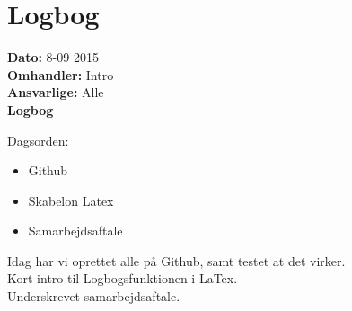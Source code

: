 \chapter{Logbog}

\textbf{Dato:} 8-09 2015 \\
\textbf{Omhandler:} Intro \\
\textbf{Ansvarlige:} Alle \\
\textbf{Logbog}

Dagsorden:
\begin{itemize}
	\item Github
	\item Skabelon Latex
	\item Samarbejdsaftale
\end{itemize}

Idag har vi oprettet alle på Github, samt testet at det virker.\\
Kort intro til Logbogsfunktionen i LaTex.\\
Underskrevet samarbejdsaftale.
